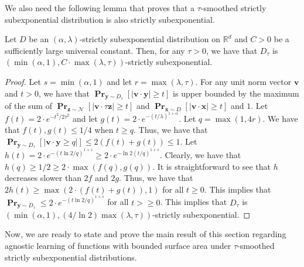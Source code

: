 \documentclass{theoretics}
\renewcommand\vec[1]{\mathbf{#1}}
\DeclareMathOperator*{\pr}{\mathbf{Pr}}
\newcommand{\R}{\mathbb{R}}
\newcommand{\1}{\Ind}
\newcommand{\x}{\vec x}
\renewcommand{\vv}{\vec v}
\newcommand{\z}{\vec z}
\newcommand{\Gauss}{\mathcal{N}}
\begin{document}
We also need the following lemma that proves that a $\tau$-smoothed strictly subexponential distribution is also strictly subexponential.
\begin{lemma}
\label{lem:subexp_convolve}
Let $D$ be an $(\alpha,\lambda)$-strictly subexponential distribution on $\R^{d}$ and $C>0$ be a sufficiently large universal constant. Then, for any $\tau>0$, we have that $D_{\tau}$ is $(\min(\alpha,1),C\cdot \max(\lambda,\tau))$-strictly subexponential.
\end{lemma}
\begin{proof}
    Let $s=\min(\alpha,1)$ and let $r=\max(\lambda,\tau)$. For any unit norm vector $\vv$ and $t>0$, we have that $\pr_{\vec y\sim D_{\tau}}[|\vv\cdot \vec y|\geq t]$ is upper bounded by the maximum of the sum of $\pr_{\z\sim \Gauss}[|\vv\cdot \tau \z|\geq t]$ and $\pr_{\x\sim D}[|\vv\cdot \x|\geq t]$ and $1$. Let $f(t)=2\cdot e^{-t^2/2\tau^2}$ and let $g(t)=2\cdot e^{-(t/\lambda)^{1+\alpha}}$. Let $q=\max(1,4r)$. We have that $f(t),g(t)\leq 1/4$ when $t\geq q$. Thus, we have that $\pr_{\vec y\sim D_{\tau}}[|\vv\cdot \vec y\geq q|]\leq 2(f(t)+g(t))\leq 1$. Let $h(t)=2\cdot e^{-(t\ln 2/q)^{1+s}}\geq 2\cdot e^{-\ln 2 (t/q)^{1+s}}$. Clearly, we have that $h(q)\geq 1/2\geq 2\cdot \max{(f(q),g(q))}$. It is straightforward to see that $h$ decreases slower than $2f$ and $2g$. Thus, we have that $2h(t)\geq \max(2\cdot(f(t)+g(t)),1)$ for all $t\geq 0$. This implies that $\pr_{\vec y\sim D_{\tau}}\leq 2\cdot e^{-(t\ln 2/q)^{1+s}}$ for all $t>\geq 0$. This implies that $D_{\tau}$ is $(\min(\alpha,1),(4/\ln 2)\max(\lambda,\tau))$-strictly subexponential.
    
\end{proof}

Now, we are ready to state and prove the main result of this section regarding agnostic learning of functions with bounded surface area under $\tau$-smoothed strictly subexponential distributions.
\end{document}
